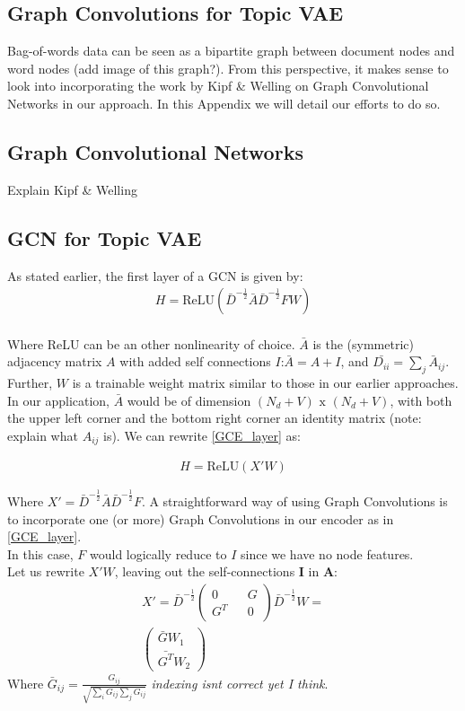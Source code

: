 \documentclass{report}
\begin{document}
\begin{appendices}
	\chapter{Graph Convolutions for Topic VAE}
	
	Bag-of-words data can be seen as a bipartite graph between document nodes and word nodes (add image of this graph?). From this perspective, it makes sense to look into incorporating the work by Kipf \& Welling on Graph Convolutional Networks in our approach. In this Appendix we will detail our efforts to do so. \\
	\section{Graph Convolutional Networks}
	Explain Kipf \& Welling 
	\section{GCN for Topic VAE}	
	As stated earlier, the first layer of a GCN is given by:
	\begin{align}\label{GCE_layer}
	H = \text{ReLU}(\bar{D}^{-\frac{1}{2}}\bar{A}\bar{D}^{-\frac{1}{2}}FW)
	\end{align}
	\\
	Where ReLU can be an other nonlinearity of choice. $\bar{A}$ is the (symmetric) adjacency matrix $A$ with added self connections $I$:$\bar{A} = A+I$, and $\bar{D_{ii}}=\sum_j\bar{A}_{ij}$. Further, $W$ is a trainable weight matrix similar to those in our earlier approaches. In our application, $\bar{A}$ would be of dimension $(N_d + V) \text{ x } (N_d + V)$, with both the upper left corner and the bottom right corner an identity matrix (note: explain what $A_{ij}$ is). We can rewrite \ref{GCE_layer} as:
	
	\begin{align}
	H = \text{ReLU}(X'W)
	\end{align}
	
	Where $X' = \bar{D}^{-\frac{1}{2}}\bar{A}\bar{D}^{-\frac{1}{2}}F$. A straightforward way of using Graph Convolutions is to incorporate one (or more) Graph Convolutions in our encoder as in \ref{GCE_layer}. \\ In this case, $F$ would logically reduce to $I$ since we have no node features. \\
	Let us rewrite $X'W$, leaving out the self-connections $\mathbf{I}$ in $\mathbf{A}$: 
	\begin{align}
	X' = \bar{D}^{-\frac{1}{2}}
	\left( \begin{matrix} 
	0 && G \\
	G^T && 0
	\end{matrix} \right) \bar{D}^{-\frac{1}{2}}W = \\
	\left(\begin{matrix}
	\bar{G}W_1 \\
	\bar{G^T}W_2
	\end{matrix}\right)\label{highlow}  
	\end{align}
	Where $\bar{G}_{ij} = 
	\frac{G_{ij}}{\sqrt{\sum_i G_{ij} \sum_{j} G_{ij}}}$ \textit{indexing isnt correct yet I think}.
	

\end{appendices}
\end{document}
